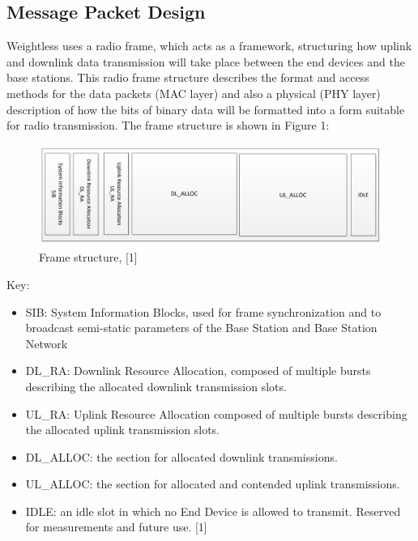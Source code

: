 \documentclass[12pt]{article}
\begin{document}
\subsection{Message Packet Design}
Weightless uses a radio frame, which acts as a framework, structuring how uplink and downlink data transmission will take place between the end devices and the base stations. This radio frame structure describes the format and access methods for the data packets (MAC layer) and also a physical (PHY layer) description of how the bits of binary data will be formatted into a form suitable for radio transmission. The frame structure is shown in Figure 1:\newline

\begin{figure}[h]
\caption{Frame structure, [1]}
\includegraphics[scale = 0.55]{./images/comms_frame.png}
\end{figure}

Key:
\begin{itemize}
\item SIB: System Information Blocks, used for frame synchronization and to broadcast semi-static parameters of the Base Station and Base Station Network
\item DL\_RA: Downlink Resource Allocation, composed of multiple bursts describing the allocated downlink transmission slots.
\item UL\_RA: Uplink Resource Allocation composed of multiple bursts describing the allocated uplink transmission slots.
\item DL\_ALLOC: the section for allocated downlink transmissions.
\item UL\_ALLOC: the section for allocated and contended uplink transmissions.
\item IDLE: an idle slot in which no End Device is allowed to transmit. Reserved for measurements and future use. [1]
\end{itemize}
\end{document}
